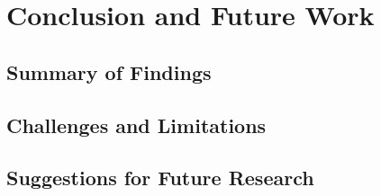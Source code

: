 \section{Conclusion and Future Work}

\subsection{Summary of Findings}

\subsection{Challenges and Limitations}

\subsection{Suggestions for Future Research}